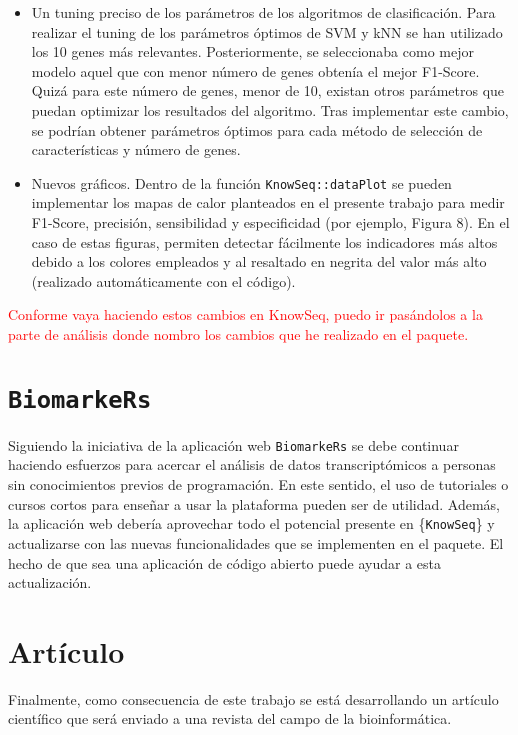 \begin{itemize}
	\item Un tuning preciso de los parámetros de los algoritmos de clasificación. Para realizar el tuning de los parámetros óptimos de SVM y kNN se han utilizado los 10 genes más relevantes. Posteriormente, se seleccionaba como mejor modelo aquel que con menor número de genes obtenía el mejor F1-Score. Quizá para este número de genes, menor de 10, existan otros parámetros que puedan optimizar los resultados del algoritmo. Tras implementar este cambio, se podrían obtener parámetros óptimos para cada método de selección de características y número de genes.
	\item Nuevos gráficos. Dentro de la función \texttt{KnowSeq::dataPlot} se pueden implementar los mapas de calor planteados en el presente trabajo para medir F1-Score, precisión, sensibilidad y especificidad (por ejemplo, Figura 8). En el caso de estas figuras, permiten detectar fácilmente los indicadores más altos debido a los colores empleados y al resaltado en negrita del valor más alto (realizado automáticamente con el código).
\end{itemize}

\textcolor{red}{Conforme vaya haciendo estos cambios en KnowSeq, puedo ir pasándolos a la parte de análisis donde nombro los cambios que he realizado en el paquete.}

\section{\texttt{BiomarkeRs}}

Siguiendo la iniciativa de la aplicación web \texttt{BiomarkeRs} se debe continuar haciendo esfuerzos para acercar el análisis de datos transcriptómicos a personas sin conocimientos previos de programación. En este sentido, el uso de tutoriales o cursos cortos para enseñar a usar la plataforma pueden ser de utilidad. Además, la aplicación web debería aprovechar todo el potencial presente en \{\texttt{KnowSeq}\} y actualizarse con las nuevas funcionalidades que se implementen en el paquete. El hecho de que sea una aplicación de código abierto puede ayudar a esta actualización. \\

\section{Artículo}

Finalmente, como consecuencia de este trabajo se está desarrollando un artículo científico que será enviado a una revista del campo de la bioinformática.




